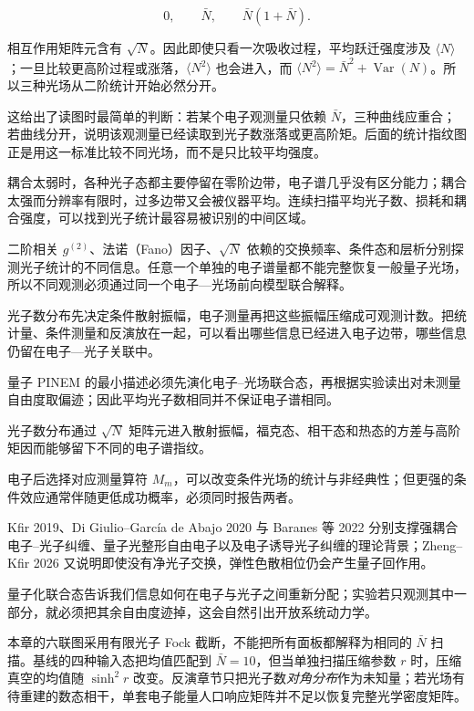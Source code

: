 \begin{equation*}
0,\qquad \bar N,\qquad \bar N(1+\bar N).
\end{equation*}


相互作用矩阵元含有 $\sqrt N$。因此即使只看一次吸收过程，平均跃迁强度涉及 $\langle N\rangle$；一旦比较更高阶过程或涨落，$\langle N^2\rangle$ 也会进入，而 $\langle N^2\rangle=\bar N^2+\operatorname{Var}(N)$。所以三种光场从二阶统计开始必然分开。

这给出了读图时最简单的判断：若某个电子观测量只依赖 $\bar N$，三种曲线应重合；若曲线分开，说明该观测量已经读取到光子数涨落或更高阶矩。后面的统计指纹图正是用这一标准比较不同光场，而不是只比较平均强度。

耦合太弱时，各种光子态都主要停留在零阶边带，电子谱几乎没有区分能力；耦合太强而分辨率有限时，过多边带又会被仪器平均。连续扫描平均光子数、损耗和耦合强度，可以找到光子统计最容易被识别的中间区域。


二阶相关 $g^{(2)}$、法诺（Fano）因子、$\sqrt N$ 依赖的交换频率、条件态和层析分别探测光子统计的不同信息。任意一个单独的电子谱量都不能完整恢复一般量子光场，所以不同观测必须通过同一个电子—光场前向模型联合解释。


\medskip
光子数分布先决定条件散射振幅，电子测量再把这些振幅压缩成可观测计数。把统计量、条件测量和反演放在一起，可以看出哪些信息已经进入电子边带，哪些信息仍留在电子—光子关联中。


\medskip
量子 PINEM 的最小描述必须先演化电子--光场联合态，再根据实验读出对未测量自由度取偏迹；因此平均光子数相同并不保证电子谱相同。

光子数分布通过 $\sqrt N$ 矩阵元进入散射振幅，福克态、相干态和热态的方差与高阶矩因而能够留下不同的电子谱指纹。

电子后选择对应测量算符 $M_m$，可以改变条件光场的统计与非经典性；但更强的条件效应通常伴随更低成功概率，必须同时报告两者。

Kfir 2019、Di Giulio--García de Abajo 2020 与 Baranes 等 2022 分别支撑强耦合电子--光子纠缠、量子光整形自由电子以及电子诱导光子纠缠的理论背景；Zheng--Kfir 2026 又说明即使没有净光子交换，弹性色散相位仍会产生量子回作用。

量子化联合态告诉我们信息如何在电子与光子之间重新分配；实验若只观测其中一部分，就必须把其余自由度迹掉，这会自然引出开放系统动力学。

\clearpage
\par\medskip 本章的六联图采用有限光子 Fock 截断，不能把所有面板都解释为相同的 $\bar N$ 扫描。基线的四种输入态把均值匹配到 $\bar N=10$，但当单独扫描压缩参数 $r$ 时，压缩真空的均值随 $\sinh^2r$ 改变。反演章节只把光子数\emph{对角分布}作为未知量；若光场有待重建的数态相干，单套电子能量人口响应矩阵并不足以恢复完整光学密度矩阵。


